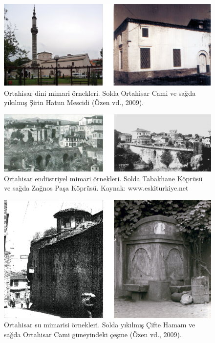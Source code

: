 \documentclass[12pt,turkish,a4paperpaper,]{report}
\begin{document}
\begin{figure}
\centering
\includegraphics[width=1\textwidth,height=\textheight]{source/figures/DiniMimari.png}
\caption{Ortahisar dini mimari örnekleri. Solda Ortahisar Cami ve sağda
yıkılmış Şirin Hatun Mescidi (Özen vd., 2009).}
\end{figure}

\begin{figure}
\centering
\includegraphics[width=1\textwidth,height=\textheight]{source/figures/EndustriyelMimari.png}
\caption{Ortahisar endüstriyel mimari örnekleri. Solda Tabakhane Köprüsü
ve sağda Zağnos Paşa Köprüsü. Kaynak: www.eskiturkiye.net}
\end{figure}

\begin{figure}
\centering
\includegraphics[width=1\textwidth,height=\textheight]{source/figures/SuMimarisi.png}
\caption{Ortahisar su mimarisi örnekleri. Solda yıkılmış Çifte Hamam ve
sağda Ortahisar Cami güneyindeki çeşme (Özen vd., 2009).}
\end{figure}
\end{document}
